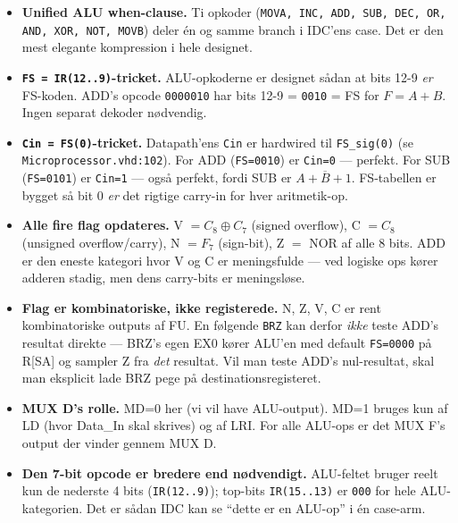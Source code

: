 \documentclass[11pt,a4paper]{article}
\begin{document}
\begin{itemize}
  \item \textbf{Unified ALU when-clause.} Ti opkoder (\texttt{MOVA, INC, ADD, SUB, DEC, OR, AND, XOR, NOT, MOVB})
        deler én og samme branch i IDC'ens case. Det er den mest elegante kompression i hele designet.

  \item \textbf{\texttt{FS = IR(12..9)}-tricket.} ALU-opkoderne er designet sådan at bits 12-9 \emph{er} FS-koden.
        ADD's opcode \texttt{0000010} har bits 12-9 = \texttt{0010} = FS for $F=A+B$. Ingen separat dekoder nødvendig.

  \item \textbf{\texttt{Cin = FS(0)}-tricket.} Datapath'ens \texttt{Cin} er hardwired til \texttt{FS\_sig(0)}
        (se \texttt{Microprocessor.vhd:102}). For ADD (\texttt{FS=0010}) er \texttt{Cin=0} --- perfekt.
        For SUB (\texttt{FS=0101}) er \texttt{Cin=1} --- også perfekt, fordi SUB er $A + \overline{B} + 1$.
        FS-tabellen er bygget så bit 0 \emph{er} det rigtige carry-in for hver aritmetik-op.

  \item \textbf{Alle fire flag opdateres.} V $= C_8 \oplus C_7$ (signed overflow),
        C $= C_8$ (unsigned overflow/carry), N $= F_7$ (sign-bit), Z $=$ NOR af alle 8 bits.
        ADD er den eneste kategori hvor V og C er meningsfulde --- ved logiske ops kører adderen stadig,
        men dens carry-bits er meningsløse.

  \item \textbf{Flag er kombinatoriske, ikke registerede.} N, Z, V, C er rent kombinatoriske outputs af FU.
        En følgende \texttt{BRZ} kan derfor \emph{ikke} teste ADD's resultat direkte --- BRZ's egen EX0
        kører ALU'en med default \texttt{FS=0000} på R[SA] og sampler Z fra \emph{det} resultat.
        Vil man teste ADD's nul-resultat, skal man eksplicit lade BRZ pege på destinationsregisteret.

  \item \textbf{MUX D's rolle.} MD=0 her (vi vil have ALU-output). MD=1 bruges kun af LD (hvor Data\_In
        skal skrives) og af LRI. For alle ALU-ops er det MUX F's output der vinder gennem MUX D.

  \item \textbf{Den 7-bit opcode er bredere end nødvendigt.} ALU-feltet bruger reelt kun de nederste
        4 bits (\texttt{IR(12..9)}); top-bits \texttt{IR(15..13)} er \texttt{000} for hele ALU-kategorien.
        Det er sådan IDC kan se ``dette er en ALU-op'' i én case-arm.
\end{itemize}
\end{document}
